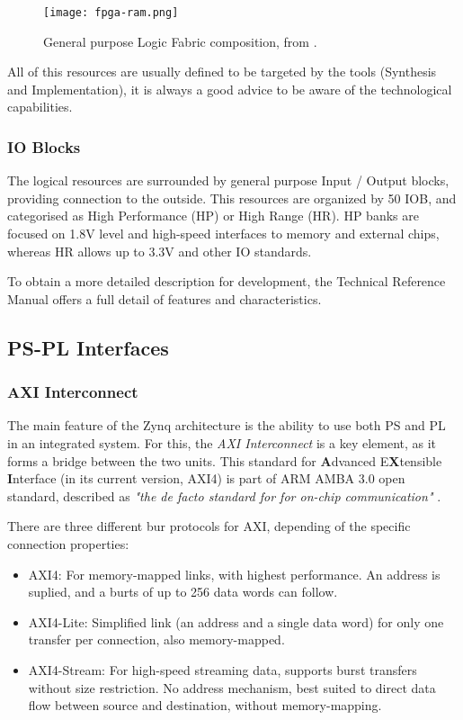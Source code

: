 \begin{figure}[htp]
	\centering
	\texttt{[image: fpga-ram.png]}
	\caption{General purpose Logic Fabric composition, from \cite{Crokett2014}.} \label{fig:fpga-ram}
\end{figure}

All of this resources are usually defined to be targeted by the tools (Synthesis and Implementation), it is always a good advice to be aware of the technological capabilities.

\subsubsection{IO Blocks}

The logical resources are surrounded by general purpose Input / Output blocks, providing connection to the outside. This resources are organized by 50 IOB, and categorised as High Performance (HP) or High Range (HR). HP banks are focused on 1.8V level and high-speed interfaces to memory and external chips, whereas HR allows up to 3.3V and other IO standards.

To obtain a more detailed description for development, the Technical Reference Manual \cite[p.~38]{UG585} offers a full detail of features and characteristics.

\subsection{PS-PL Interfaces}

\subsubsection*{AXI Interconnect}

The main feature of the Zynq architecture is the ability to use both PS and PL in an integrated system. For this, the \textit{AXI Interconnect} is a key element, as it forms a bridge between the two units. This standard for \textbf{A}dvanced E\textbf{X}tensible \textbf{I}nterface (in its current version, AXI4) is part of ARM AMBA 3.0 open standard, described as \textit{"the de facto standard for for on-chip communication"} \cite{Crokett2014}.

There are three different bur protocols for AXI, depending of the specific connection properties:

\begin{itemize}
	\item AXI4: For memory-mapped links, with highest performance. An address is suplied, and a burts of up to 256 data words can follow.
	\item AXI4-Lite: Simplified link (an address and a single data word) for only one transfer per connection, also memory-mapped.
	\item AXI4-Stream: For high-speed streaming data, supports burst transfers without size restriction. No address mechanism, best suited to direct data flow between source and destination, without memory-mapping.
\end{itemize}

